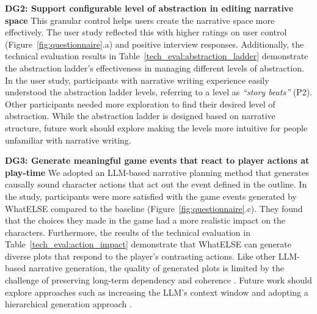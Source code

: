 \textbf{DG2: Support configurable level of abstraction in editing narrative space} 
This granular control helps users create the narrative space more effectively. The user study reflected this with higher ratings on user control (Figure~\ref{fig:questionnaire}.a) and positive interview responses. Additionally, the technical evaluation results in Table~\ref{tech_eval:abstraction_ladder} demonstrate the abstraction ladder's effectiveness in managing different levels of abstraction. In the user study, participants with narrative writing experience easily understood the abstraction ladder levels, referring to a level as {\it ``story beats''} (P2). Other participants needed more exploration to find their desired level of abstraction. While the abstraction ladder is designed based on narrative structure, future work should explore making the levels more intuitive for people unfamiliar with narrative writing.

\textbf{DG3: Generate meaningful game events that react to player actions at play-time} We adopted an LLM-based narrative planning method that generates causally sound character actions that act out the event defined in the outline. In the study, participants were more satisfied with the game events generated by {\sc WhatELSE} compared to the baseline (Figure~\ref{fig:questionnaire}.c). They found that the choices they made in the game had a more realistic impact on the characters. Furthermore, the results of the technical evaluation in Table~\ref{tech_eval:action_impact} demonstrate that {\sc WhatELSE} can generate diverse plots that respond to the player’s contrasting actions. Like other LLM-based narrative generation, the quality of generated plots is limited by the challenge of preserving long-term dependency and coherence \cite{mirowski2023co}. Future work should explore approaches such as increasing the LLM’s context window \cite{kaddour2023challenges} and adopting a hierarchical generation approach \cite{mirowski2023co}.





